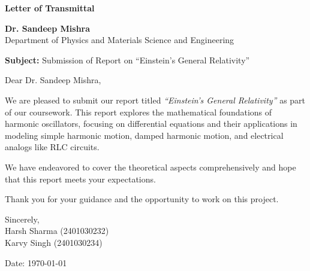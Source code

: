 \documentclass[12pt,a4paper]{article}
\begin{document}
\begin{center}
    \Large\textbf{Letter of Transmittal}
\end{center}
\vspace{1cm}

\noindent
\textbf{Dr. Sandeep Mishra} \\
[0.5em]
Department of Physics and Materials Science and Engineering\\
[0.5em]

\vspace{1cm}

\noindent
\textbf{Subject:} Submission of Report on ``Einstein's General Relativity''

\vspace{1cm}

\noindent
Dear Dr. Sandeep Mishra,

\vspace{1em}

\noindent
We are pleased to submit our report titled \textit{``Einstein's General Relativity''} as part of our coursework. This report explores the mathematical foundations of harmonic oscillators, focusing on differential equations and their applications in modeling simple harmonic motion, damped harmonic motion, and electrical analogs like RLC circuits.

\vspace{1em}

\noindent
We have endeavored to cover the theoretical aspects comprehensively and hope that this report meets your expectations.

\vspace{1em}

\noindent
Thank you for your guidance and the opportunity to work on this project.

\vspace{2em}

\noindent
Sincerely, \\[2em]

\noindent
Harsh Sharma (2401030232)\\
Karvy Singh (2401030234)\\

\vspace{2cm}

\noindent
Date: \today

\newpage

\tableofcontents

\newpage
\end{document}
